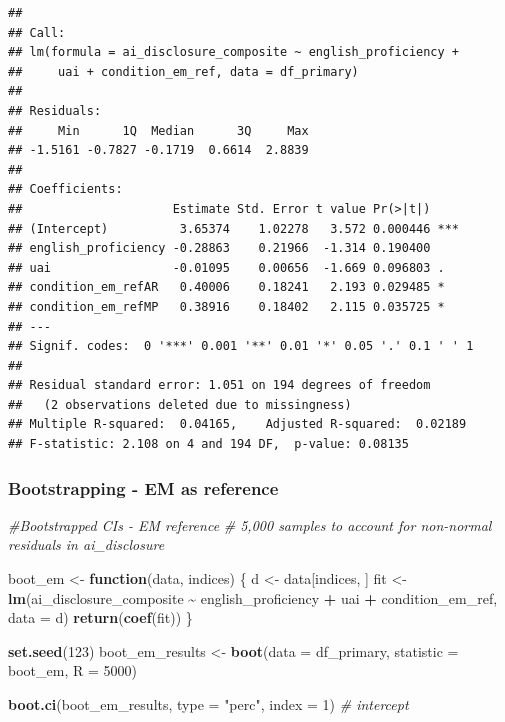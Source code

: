 \documentclass[
]{article}
\newenvironment{Shaded}{\begin{snugshade}}{\end{snugshade}}
\newcommand{\AttributeTok}[1]{\textcolor[rgb]{0.13,0.29,0.53}{#1}}
\newcommand{\CommentTok}[1]{\textcolor[rgb]{0.56,0.35,0.01}{\textit{#1}}}
\newcommand{\ControlFlowTok}[1]{\textcolor[rgb]{0.13,0.29,0.53}{\textbf{#1}}}
\newcommand{\DecValTok}[1]{\textcolor[rgb]{0.00,0.00,0.81}{#1}}
\newcommand{\FunctionTok}[1]{\textcolor[rgb]{0.13,0.29,0.53}{\textbf{#1}}}
\newcommand{\NormalTok}[1]{#1}
\newcommand{\OtherTok}[1]{\textcolor[rgb]{0.56,0.35,0.01}{#1}}
\newcommand{\SpecialCharTok}[1]{\textcolor[rgb]{0.81,0.36,0.00}{\textbf{#1}}}
\newcommand{\StringTok}[1]{\textcolor[rgb]{0.31,0.60,0.02}{#1}}
\begin{document}
\begin{verbatim}
## 
## Call:
## lm(formula = ai_disclosure_composite ~ english_proficiency + 
##     uai + condition_em_ref, data = df_primary)
## 
## Residuals:
##     Min      1Q  Median      3Q     Max 
## -1.5161 -0.7827 -0.1719  0.6614  2.8839 
## 
## Coefficients:
##                     Estimate Std. Error t value Pr(>|t|)    
## (Intercept)          3.65374    1.02278   3.572 0.000446 ***
## english_proficiency -0.28863    0.21966  -1.314 0.190400    
## uai                 -0.01095    0.00656  -1.669 0.096803 .  
## condition_em_refAR   0.40006    0.18241   2.193 0.029485 *  
## condition_em_refMP   0.38916    0.18402   2.115 0.035725 *  
## ---
## Signif. codes:  0 '***' 0.001 '**' 0.01 '*' 0.05 '.' 0.1 ' ' 1
## 
## Residual standard error: 1.051 on 194 degrees of freedom
##   (2 observations deleted due to missingness)
## Multiple R-squared:  0.04165,    Adjusted R-squared:  0.02189 
## F-statistic: 2.108 on 4 and 194 DF,  p-value: 0.08135
\end{verbatim}

\subsubsection{Bootstrapping - EM as
reference}\label{bootstrapping---em-as-reference}

\begin{Shaded}
\begin{Highlighting}[]
\CommentTok{\#Bootstrapped CIs {-} EM reference}
\CommentTok{\# 5,000 samples to account for non{-}normal residuals in ai\_disclosure}

\NormalTok{boot\_em }\OtherTok{\textless{}{-}} \ControlFlowTok{function}\NormalTok{(data, indices) \{}
\NormalTok{  d }\OtherTok{\textless{}{-}}\NormalTok{ data[indices, ]}
\NormalTok{  fit }\OtherTok{\textless{}{-}} \FunctionTok{lm}\NormalTok{(ai\_disclosure\_composite }\SpecialCharTok{\textasciitilde{}}\NormalTok{ english\_proficiency }\SpecialCharTok{+}\NormalTok{ uai }\SpecialCharTok{+}
\NormalTok{              condition\_em\_ref, }\AttributeTok{data =}\NormalTok{ d)}
  \FunctionTok{return}\NormalTok{(}\FunctionTok{coef}\NormalTok{(fit))}
\NormalTok{\}}

\FunctionTok{set.seed}\NormalTok{(}\DecValTok{123}\NormalTok{)}
\NormalTok{boot\_em\_results }\OtherTok{\textless{}{-}} \FunctionTok{boot}\NormalTok{(}\AttributeTok{data =}\NormalTok{ df\_primary, }\AttributeTok{statistic =}\NormalTok{ boot\_em, }\AttributeTok{R =} \DecValTok{5000}\NormalTok{)}

\FunctionTok{boot.ci}\NormalTok{(boot\_em\_results, }\AttributeTok{type =} \StringTok{"perc"}\NormalTok{, }\AttributeTok{index =} \DecValTok{1}\NormalTok{) }\CommentTok{\# intercept}
\end{Highlighting}
\end{Shaded}
\end{document}

